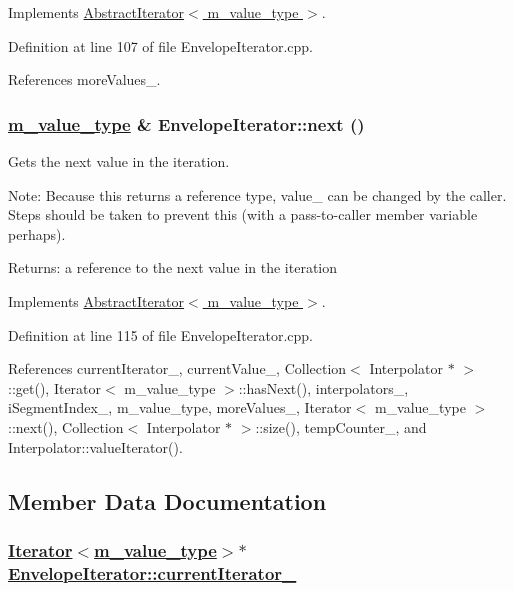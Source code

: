 Implements \hyperlink{classAbstractIterator_a1}{Abstract\-Iterator$<$ m\_\-value\_\-type $>$}.

Definition at line 107 of file Envelope\-Iterator.cpp.

References more\-Values\_\-.\hypertarget{classEnvelopeIterator_a4}{
\subsubsection[next]{\setlength{\rightskip}{0pt plus 5cm}\hyperlink{Types_8h_a3}{m\_\-value\_\-type} \& Envelope\-Iterator::next ()}}
\label{classEnvelopeIterator_a4}


Gets the next value in the iteration. \begin{Desc}
\item[Note:]Because this returns a reference type, value\_\- can be changed by the caller. Steps should be taken to prevent this (with a pass-to-caller member variable perhaps). \end{Desc}
\begin{Desc}
\item[Returns:]a reference to the next value in the iteration \end{Desc}


Implements \hyperlink{classAbstractIterator_a2}{Abstract\-Iterator$<$ m\_\-value\_\-type $>$}.

Definition at line 115 of file Envelope\-Iterator.cpp.

References current\-Iterator\_\-, current\-Value\_\-, Collection$<$ Interpolator $\ast$ $>$::get(), Iterator$<$ m\_\-value\_\-type $>$::has\-Next(), interpolators\_\-, i\-Segment\-Index\_\-, m\_\-value\_\-type, more\-Values\_\-, Iterator$<$ m\_\-value\_\-type $>$::next(), Collection$<$ Interpolator $\ast$ $>$::size(), temp\-Counter\_\-, and Interpolator::value\-Iterator().

\subsection{Member Data Documentation}
\hypertarget{classEnvelopeIterator_r2}{
\subsubsection[currentIterator\_\-]{\setlength{\rightskip}{0pt plus 5cm}\hyperlink{classIterator}{Iterator}$<$\hyperlink{Types_8h_a3}{m\_\-value\_\-type}$>$$\ast$ \hyperlink{classEnvelopeIterator_r2}{Envelope\-Iterator::current\-Iterator\_\-}}}
\label{classEnvelopeIterator_r2}


